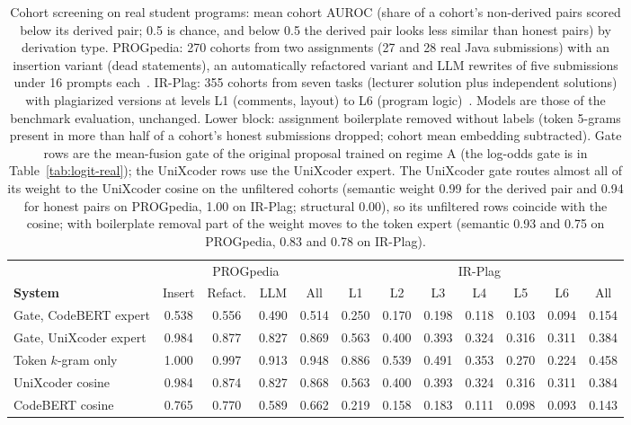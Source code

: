 \begin{table}[t]
\centering
\caption{Cohort screening on real student programs: mean cohort AUROC (share of a cohort's non-derived pairs scored below its derived pair; 0.5 is chance, and below 0.5 the derived pair looks less similar than honest pairs) by derivation type. PROGpedia: 270 cohorts from two assignments (27 and 28 real Java submissions) with an insertion variant (dead statements), an automatically refactored variant and LLM rewrites of five submissions under 16 prompts each~\cite{b36}. IR-Plag: 355 cohorts from seven tasks (lecturer solution plus independent solutions) with plagiarized versions at levels L1 (comments, layout) to L6 (program logic)~\cite{b37}. Models are those of the benchmark evaluation, unchanged. Lower block: assignment boilerplate removed without labels (token 5-grams present in more than half of a cohort's honest submissions dropped; cohort mean embedding subtracted). Gate rows are the mean-fusion gate of the original proposal trained on regime A (the log-odds gate is in Table~\ref{tab:logit-real}); the UniXcoder rows use the UniXcoder expert. The UniXcoder gate routes almost all of its weight to the UniXcoder cosine on the unfiltered cohorts (semantic weight 0.99 for the derived pair and 0.94 for honest pairs on PROGpedia, 1.00 on IR-Plag; structural 0.00), so its unfiltered rows coincide with the cosine; with boilerplate removal part of the weight moves to the token expert (semantic 0.93 and 0.75 on PROGpedia, 0.83 and 0.78 on IR-Plag).}
\label{tab:cohort}
\scriptsize
\setlength{\tabcolsep}{3.5pt}
\begin{tabular}{l|cccc|ccccccc}
\toprule
 & \multicolumn{4}{c|}{PROGpedia} & \multicolumn{7}{c}{IR-Plag} \\
\textbf{System} & Insert & Refact. & LLM & All & L1 & L2 & L3 & L4 & L5 & L6 & All \\
\midrule
Gate, CodeBERT expert & 0.538 & 0.556 & 0.490 & 0.514 & 0.250 & 0.170 & 0.198 & 0.118 & 0.103 & 0.094 & 0.154 \\
Gate, UniXcoder expert & 0.984 & 0.877 & 0.827 & 0.869 & 0.563 & 0.400 & 0.393 & 0.324 & 0.316 & 0.311 & 0.384 \\
Token $k$-gram only & 1.000 & 0.997 & 0.913 & 0.948 & 0.886 & 0.539 & 0.491 & 0.353 & 0.270 & 0.224 & 0.458 \\
UniXcoder cosine & 0.984 & 0.874 & 0.827 & 0.868 & 0.563 & 0.400 & 0.393 & 0.324 & 0.316 & 0.311 & 0.384 \\
CodeBERT cosine & 0.765 & 0.770 & 0.589 & 0.662 & 0.219 & 0.158 & 0.183 & 0.111 & 0.098 & 0.093 & 0.143 \\

\end{tabular}
\end{table}
